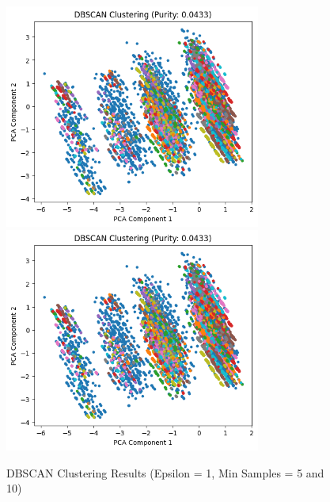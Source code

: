 \documentclass{article}
\begin{document}
\begin{figure}[H]
\centering
\includegraphics[width=0.75\textwidth]{DBScan_1_5.png}
\includegraphics[width=0.75\textwidth]{DBScan_1_10.png}
\caption{DBSCAN Clustering Results (Epsilon = 1, Min Samples = 5 and 10)}
\end{figure}
\end{document}
